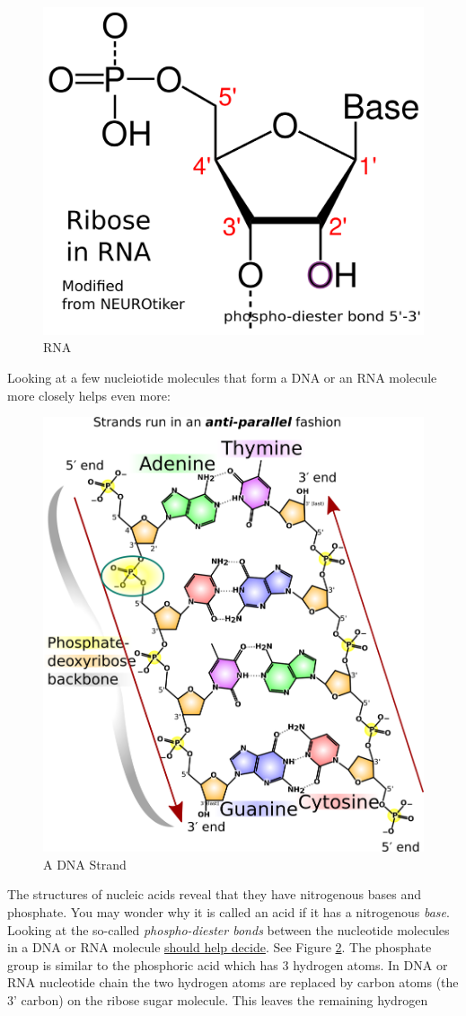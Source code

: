 \documentclass[12pt]{article}
\begin{document}
\begin{figure}[ht!]
    \centering
    \includegraphics[width=0.5\linewidth]{rna-ribose-numbering-std-notation.png}
    \caption{RNA}
    \label{fig: rna}
\end{figure}

Looking at a few nucleiotide molecules that form a DNA or an RNA molecule more closely helps even more:

\begin{figure}[ht!]
    \centering
    \includegraphics[width=0.5\linewidth]{DNA_chemical_structure-madprime.png}
    \caption{A DNA Strand}
    \label{fig: dna-strand}
\end{figure}


The structures of nucleic acids reveal that they have nitrogenous bases and phosphate. You may wonder why it is called an acid if it has a nitrogenous \emph{base}. Looking at the so-called \emph{phospho-diester bonds} between the nucleotide molecules in a DNA or RNA molecule \href{https://biology.stackexchange.com/questions/3864/dna-as-an-acid}{should help decide}. See Figure \ref{fig: dna-strand}. The phosphate group is similar to the phosphoric acid  which has 3 hydrogen atoms. In DNA or RNA nucleotide chain the two hydrogen atoms are replaced by carbon atoms (the 3' carbon) on the ribose sugar molecule. This leaves the remaining hydrogen
\end{document}
